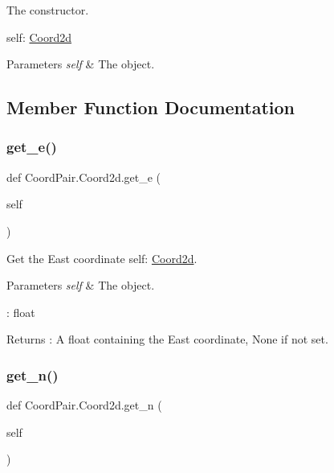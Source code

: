 The constructor. 

self\+: \hyperlink{classCoordPair_1_1Coord2d}{Coord2d} 
\begin{DoxyParams}{Parameters}
{\em self} & The object. \\
\hline
\end{DoxyParams}


\subsection{Member Function Documentation}
\mbox{\label{classCoordPair_1_1Coord2d_add74de639a8a6380d0329f576dfe09f0}} 
\subsubsection{\texorpdfstring{get\+\_\+e()}{get\_e()}}
{\footnotesize\ttfamily def Coord\+Pair.\+Coord2d.\+get\+\_\+e (\begin{DoxyParamCaption}\item[{}]{self }\end{DoxyParamCaption})}



Get the East coordinate  self\+: \hyperlink{classCoordPair_1_1Coord2d}{Coord2d}. 


\begin{DoxyParams}{Parameters}
{\em self} & The object.\\
\hline
\end{DoxyParams}
\+: float \begin{DoxyReturn}{Returns}
\+: A float containing the East coordinate, None if not set. 
\end{DoxyReturn}
\mbox{\label{classCoordPair_1_1Coord2d_a8d2fb363ed198be582db7a8b5838e29c}} 
\subsubsection{\texorpdfstring{get\+\_\+n()}{get\_n()}}
{\footnotesize\ttfamily def Coord\+Pair.\+Coord2d.\+get\+\_\+n (\begin{DoxyParamCaption}\item[{}]{self }\end{DoxyParamCaption})}



